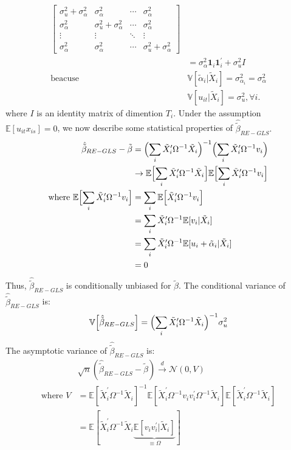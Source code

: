 \begin{align*}
\begin{bmatrix}
        \sigma_u^2 + \sigma_{\alpha}^2 & \sigma_{\alpha}^2 & \cdots & \sigma_{\alpha}^2 \\
        \sigma_{\alpha}^2 & \sigma_u^2 + \sigma_{\alpha}^2 & \cdots & \sigma_{\alpha}^2 \\
        \vdots & \vdots & \ddots & \vdots \\
        \sigma_{\alpha}^2 & \sigma_{\alpha}^2 & \cdots & \sigma_u^2 + \sigma_{\alpha}^2
    \end{bmatrix} \\
    &= \sigma_{\alpha}^2 \mathbf{1}_i \mathbf{1}_i^{\prime} + \sigma_u^2 I \\
    \text{beacuse } &\mathbb{V}[\tilde{\alpha}_i|\tilde{X}_i] = \sigma_{\alpha_i}^2 = \sigma_{\alpha}^2 \\
    &\mathbb{V}[u_{it} | \tilde{X}_i] = \sigma_u^2, \forall i.
\end{align*}
where $I$ is an identity matrix of dimention $T_i$.
Under the assumption $\mathbb{E}[u_{it} x_{is}] = 0$, we now describe some statistical properties of $\hat{\tilde{\beta}}_{RE-GLS}.$
\begin{align*}
    \hat{\tilde{\beta}}_{RE-GLS} - \tilde{\beta} &= \Bigl( \sum_i \tilde{X}_i^{\prime} \Omega^{-1} \tilde{X}_i \Bigr)^{-1} \Bigl( \sum_i \tilde{X}_i^{\prime} \Omega^{-1} v_i \Bigr) \\
    & \rightarrow \mathbb{E}\Bigl[ \sum_i \tilde{X}_i^{\prime} \Omega^{-1} \tilde{X}_i \Bigr] \mathbb{E}\Bigl[ \sum_i \tilde{X}_i^{\prime} \Omega^{-1} v_i \Bigr] \\
    \text{where } \mathbb{E}\Bigl[ \sum_i \tilde{X}_i^{\prime} \Omega^{-1} v_i \Bigr] &= \sum_i \mathbb{E}\Bigl[ \tilde{X}_i^{\prime} \Omega^{-1} v_i \Bigr] \\
    &= \sum_i \tilde{X}_i^{\prime} \Omega^{-1} \mathbb{E}[v_i | \tilde{X}_i] \\
    &= \sum_i \tilde{X}_i^{\prime} \Omega^{-1} \mathbb{E}[u_i + \tilde{\alpha}_i | \tilde{X}_i] \\
    &=0
\end{align*}
Thus, $\hat{\tilde{\beta}}_{RE-GLS} $ is conditionally unbiased for $\tilde{\beta}$.
The conditional variance of $\hat{\tilde{\beta}}_{RE-GLS}$ is:
\begin{align*}
    \mathbb{V}\Bigl[\hat{\tilde{\beta}}_{RE-GLS}\Bigr] = \Bigl( \sum_i \tilde{X}_i^{\prime} \Omega^{-1} \tilde{X}_i \Bigr)^{-1} \sigma_{u}^2
\end{align*}
The asymptotic variance of $\hat{\tilde{\beta}}_{RE-GLS}$ is:
\begin{align*}
    &\sqrt{n} \left( \hat{\tilde{\beta}}_{RE-GLS} - \tilde{\beta} \right) \overset{d}{\rightarrow} \mathcal{N}\left(0, V \right) \\
    \text{where } V &= \mathbb{E}\left[\tilde{X}_i^{\prime} \Omega^{-1} \tilde{X}_i \right]^{-1} \mathbb{E}\left[\tilde{X}_i^{\prime} \Omega^{-1} v_i v_i^{\prime} \Omega^{-1} \tilde{X}_i \right] \mathbb{E}\left[\tilde{X}_i^{\prime} \Omega^{-1} \tilde{X}_i \right] \\
    &= \mathbb{E}\left[\tilde{X}_i^{\prime} \Omega^{-1} \tilde{X}_i \underset{\equiv \Omega}{\underbrace{\mathbb{E}[v_i v_i^{\prime} | \tilde{X}_i]}}\right]
\end{align*}
